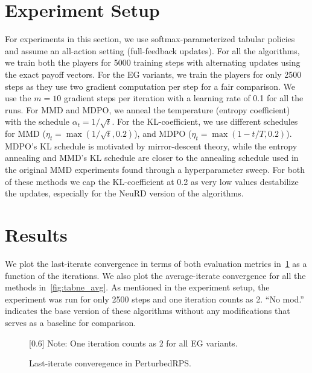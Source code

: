 
\section{Experiment Setup}
For experiments in this section, we use softmax-parameterized tabular policies and assume an
all-action setting (full-feedback updates).
For all the algorithms, we train both the players for 5000 training steps with alternating updates
using the exact payoff vectors.
For the EG variants, we train the players for only 2500 steps as they use two gradient computation
per step for a fair comparison.
We use the $m=10$ gradient steps per iteration with a learning rate of 0.1 for all the runs.
For MMD and MDPO, we anneal the temperature (entropy coefficient) with the schedule $\alpha_t =
	1/\sqrt{t}$.
For the KL-coefficient, we use different schedules for MMD ($\eta_t = \max(1 / \sqrt{t}, 0.2)$),
and MDPO ($\eta_t = \max(1 - t/T, 0.2)$).
MDPO's KL schedule is motivated by mirror-descent theory, while the entropy annealing and MMD's KL
schedule are closer to the annealing schedule used in the original MMD experiments found through a
hyperparameter sweep.
For both of these methods we cap the KL-coefficient at 0.2 as very low values destabilize the
updates, especially for the NeuRD version of the algorithms.

\section{Results}
We plot the last-iterate convergence in terms of both evaluation metrics in~\ref{fig:tabne_last} as
a function of the iterations.
We also plot the average-iterate convergence for all the methods in~\ref{fig:tabne_avg}.
As mentioned in the experiment setup, the experiment was run for only 2500 steps and one iteration
counts as 2.
``No mod.'' indicates the base version of these algorithms without any modifications that serves as a baseline
for comparison.

\begin{figure}[h] \centering \hspace*{-2cm} \scalebox{0.6}[0.6]{}
	\tiny{Note: One iteration counts as 2 for all EG variants.}
	\caption{Last-iterate converegence in PerturbedRPS.
	}\label{fig:tabne_last}
\end{figure}

